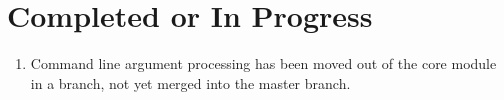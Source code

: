 \documentclass[preprint,times,authoryear,10pt]{elsarticle}
\begin{document}
\section{Completed or In Progress}\label{completed-or-in-progress}

\begin{enumerate}
\def\labelenumi{\arabic{enumi}.}
\itemsep1pt\parskip0pt
\item
  Command line argument processing has been moved out of the core module
  in a branch, not yet merged into the master branch.
\end{enumerate}





\end{document}
